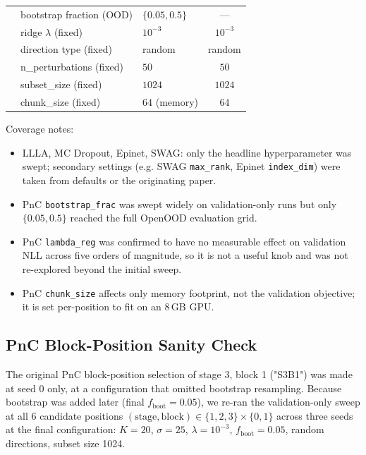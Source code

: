 \begin{table}[h]
\begin{tabular}{l l l c}
                & bootstrap fraction (OOD)   & $\{0.05, 0.5\}$            & --- \\
                & ridge $\lambda$ (fixed)    & $10^{-3}$                  & $10^{-3}$ \\
                & direction type (fixed)     & random                     & random \\
                & n\_perturbations (fixed)   & $50$                       & $50$ \\
                & subset\_size (fixed)       & $1024$                     & $1024$ \\
                & chunk\_size (fixed)        & $64$ (memory)              & $64$ \\
\bottomrule
\end{tabular}
\end{table}

Coverage notes:
\begin{itemize}
  \item LLLA, MC Dropout, Epinet, SWAG: only the headline hyperparameter was
        swept; secondary settings (e.g. SWAG \texttt{max\_rank}, Epinet
        \texttt{index\_dim}) were taken from defaults or the originating paper.
  \item PnC \texttt{bootstrap\_frac} was swept widely on validation-only runs
        but only $\{0.05, 0.5\}$ reached the full OpenOOD evaluation grid.
  \item PnC \texttt{lambda\_reg} was confirmed to have no measurable effect on
        validation NLL across five orders of magnitude, so it is not a useful
        knob and was not re-explored beyond the initial sweep.
  \item PnC \texttt{chunk\_size} affects only memory footprint, not the
        validation objective; it is set per-position to fit on an 8\,GB GPU.
\end{itemize}

\subsection{PnC Block-Position Sanity Check}
\label{app:pnc-position-sanity}

The original PnC block-position selection of stage 3, block 1 ("S3B1") was
made at seed 0 only, at a configuration that omitted bootstrap resampling.
Because bootstrap was added later (final $f_{\text{boot}} = 0.05$), we re-ran
the validation-only sweep at all 6 candidate positions
$(\text{stage}, \text{block}) \in \{1, 2, 3\} \times \{0, 1\}$ across three
seeds at the final configuration: $K = 20$, $\sigma = 25$, $\lambda = 10^{-3}$,
$f_{\text{boot}} = 0.05$, random directions, subset size 1024.

